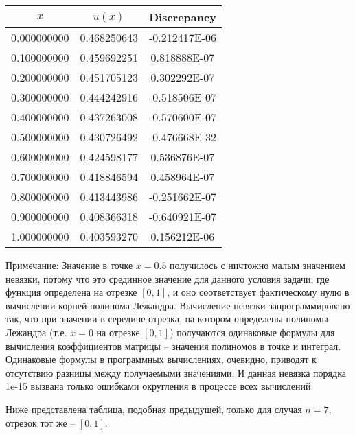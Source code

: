 \documentclass[12pt,a4paper]{article}
\begin{document}
\begin{center} 
\begin{tabular}{|c|c|c|}
\hline
         $x$      &      $u(x)$    &  Discrepancy  \\
\hline
    0.000000000 & 0.468250643 & -0.212417E-06  \\
\hline
    0.100000000 & 0.459692251 &  0.818888E-07  \\
\hline
    0.200000000 & 0.451705123 &  0.302292E-07  \\
\hline
    0.300000000 & 0.444242916 & -0.518506E-07  \\
\hline
    0.400000000 & 0.437263008 & -0.570600E-07  \\
\hline
    0.500000000 & 0.430726492 & -0.476668E-32  \\
\hline
    0.600000000 & 0.424598177 &  0.536876E-07  \\
\hline
    0.700000000 & 0.418846594 &  0.458964E-07  \\
\hline
    0.800000000 & 0.413443986 & -0.251662E-07  \\
\hline
    0.900000000 & 0.408366318 & -0.640921E-07  \\
\hline
    1.000000000 & 0.403593270 &  0.156212E-06  \\
\hline

\end{tabular}
\end{center}

Примечание: Значение в точке $x=0.5$ получилось с ничтожно малым значением невязки, потому что это срединное значение для данного условия задачи, где функция определена на отрезке $[0,1]$, и оно соответствует фактическому нулю в вычислении корней полинома Лежандра. Вычисление невязки запрограммировано так, что при значении в середине отрезка, на котором определены полиномы Лежандра (т.е. $x=0$ на отрезке $[0,1]$) получаются одинаковые формулы для вычисления коэффициентов матрицы -- значения полиномов в точке и интеграл. Одинаковые формулы в программных вычислениях, очевидно, приводят к отсутствию разницы между получаемыми значениями. И данная невязка порядка 1e-15 вызвана только ошибками округления в процессе всех вычислений.

Ниже представлена таблица, подобная предыдущей, только для случая $n=7$, отрезок тот же -- $[0,1]$.
\end{document}
